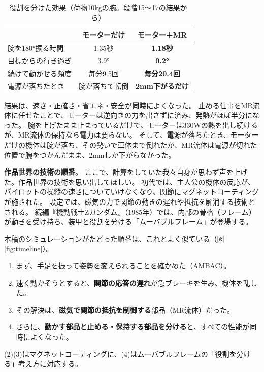 \documentclass[paper=a4paper,fontsize=10pt,twocolumn,column_gap=2zw,line_length=24zw,number_of_lines=46,head_space=18mm]{jlreq}
\begin{document}
\begin{table}[t]\centering\small
\caption{役割を分けた効果（荷物10kgの腕。段階15〜17の結果から）}\label{tab:split}
\setlength{\tabcolsep}{3pt}
\begin{tabular}{lcc}\toprule
 & モーターだけ & \textbf{モーター＋MR} \\\midrule
腕を180°振る時間 & 1.35秒 & \textbf{1.18秒} \\
目標からの行き過ぎ & 3.9° & \textbf{0.2°} \\
続けて動かせる頻度 & 毎分9.5回 & \textbf{毎分20.4回} \\
電源が落ちたとき & 腕が落ちて転倒 & \textbf{2mm下がるだけ} \\\bottomrule
\end{tabular}
\end{table}

結果は、速さ・正確さ・省エネ・安全が\textbf{同時に}よくなった。
止める仕事をMR流体に任せたことで、モーターは逆向きの力を出さずに済み、発熱がほぼ半分になった。
腕を上げたまま止まっているだけで、モーターは330Wの熱を出し続けるが、MR流体の保持なら電力は要らない。
そして、電源が落ちたとき、モーターだけの機体は腕が落ち、その勢いで車体まで倒れたが、MR流体は電源が切れた位置で腕をつかんだまま、2mmしか下がらなかった。

\textbf{作品世界の技術の順番}。
ここで、計算をしていた我々自身が思わず声を上げた。作品世界の技術を思い出してほしい。
初代では、主人公の機体の反応が、パイロットの操縦の速さについていけなくなり、関節にマグネットコーティングが施された。
設定では、磁気の力で関節の動きの遅れや抵抗を解消する技術とされる。
続編『機動戦士Ζガンダム』（1985年）\cite{zeta}では、内部の骨格（フレーム）が動きを受け持ち、装甲と役割を分ける「ムーバブルフレーム」が登場する。

本稿のシミュレーションがたどった順番は、これとよく似ている（図\ref{fig:timeline}）。
\begin{enumerate}\setlength{\itemsep}{0pt}
\item まず、手足を振って姿勢を変えられることを確かめた（AMBAC）。
\item 速く動かそうとすると、\textbf{関節の応答の遅れ}が急ブレーキを生み、機体を乱した。
\item その解決は、\textbf{磁気で関節の抵抗を制御する}部品（MR流体）だった。
\item さらに、\textbf{動かす部品と止める・保持する部品を分ける}と、すべての性能が同時によくなった。
\end{enumerate}
(2)(3)はマグネットコーティングに、(4)はムーバブルフレームの「役割を分ける」考え方に対応する。
\end{document}
